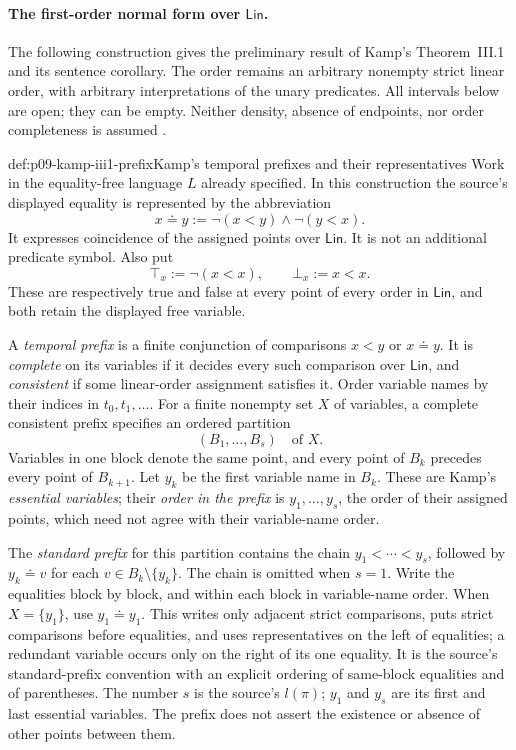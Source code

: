 
\paragraph{The first-order normal form over \(\mathsf{Lin}\).}
The following construction gives the preliminary result of Kamp's
Theorem~III.1 and its sentence corollary.  The order remains an arbitrary
nonempty strict linear order, with arbitrary interpretations of the unary
predicates.  All intervals below are open; they can be empty.  Neither
density, absence of endpoints, nor order completeness is assumed
\cite[ch.~III, defs.~4--9 and thm.~1, pp.~43--56]{Kamp1968}.

\begin{hbdefinition}{def:p09-kamp-iii1-prefix}{Kamp's temporal prefixes and their representatives}
Work in the equality-free language \(L\) already specified.  In this
construction the source's displayed equality is represented by the
abbreviation
\[
 x\doteq y:=\neg(x<y)\land\neg(y<x).
\]
It expresses coincidence of the assigned points over \(\mathsf{Lin}\).
It is not an additional predicate symbol.  Also put
\[
 \top_x:=\neg(x<x),\qquad \bot_x:=x<x.
\]
These are respectively true and false at every point of every order in
\(\mathsf{Lin}\), and both retain the displayed free variable.

A \emph{temporal prefix} is a finite conjunction of comparisons
\(x<y\) or \(x\doteq y\).  It is \emph{complete} on its variables if it
decides every such comparison over \(\mathsf{Lin}\), and
\emph{consistent} if some linear-order assignment satisfies it.
Order variable names by their indices in \(t_0,t_1,\ldots\).
For a finite nonempty set \(X\) of variables, a complete consistent prefix
specifies an ordered partition
\[
 (B_1,\ldots,B_s)\quad\text{of }X.
\]
Variables in one block denote the same point, and every point of \(B_k\)
precedes every point of \(B_{k+1}\).  Let \(y_k\) be the first variable
name in \(B_k\).  These are Kamp's \emph{essential variables}; their
\emph{order in the prefix} is \(y_1,\ldots,y_s\), the order of their
assigned points, which need not agree with their variable-name order.

The \emph{standard prefix} for this partition contains the chain
\(y_1<\cdots<y_s\), followed by
\(y_k\doteq v\) for each \(v\in B_k\setminus\{y_k\}\).
The chain is omitted when \(s=1\).
Write the equalities block by block, and within each block in variable-name
order.  When \(X=\{y_1\}\), use \(y_1\doteq y_1\).
This writes only adjacent strict comparisons, puts strict comparisons before
equalities, and uses representatives on the left of equalities; a redundant
variable occurs only on the right of its one equality.  It is the source's
standard-prefix convention with an explicit ordering of same-block
equalities and of parentheses.  The number \(s\) is the source's
\(l(\pi)\); \(y_1\) and \(y_s\) are its first and last essential
variables.  The prefix does not assert the existence or absence of other
points between them.


\end{hbdefinition}
